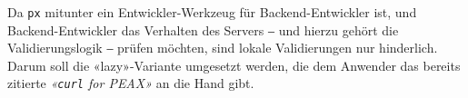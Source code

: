 Da \texttt{px} mitunter ein Entwickler-Werkzeug für Backend-Entwickler ist, und Backend-Entwickler das Verhalten des Servers ‒ und hierzu gehört die Validierungslogik ‒ prüfen möchten, sind lokale Validierungen nur hinderlich. Darum soll die «lazy»-Variante umgesetzt werden, die dem Anwender das bereits zitierte \textit{«\texttt{curl} for PEAX»} an die Hand gibt.
